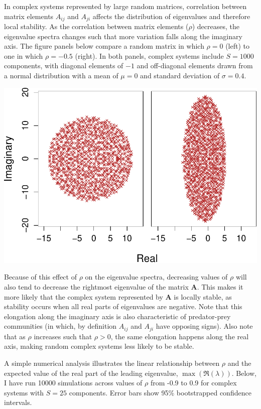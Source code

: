 \documentclass[]{article}
\begin{document}
In complex systems represented by large random matrices, correlation
between matrix elements \(A_{ij}\) and \(A_{ji}\) affects the
distribution of eigenvalues and therefore local stability. As the
correlation between matrix elements (\(\rho\)) decreases, the eigenvalue
spectra changes such that more variation falls along the imaginary axis.
The figure panels below compare a random matrix in which \(\rho = 0\)
(left) to one in which \(\rho = -0.5\) (right). In both panels, complex
systems include \(S = 1000\) components, with diagonal elements of
\(-1\) and off-diagonal elements drawn from a normal distribution with a
mean of \(\mu = 0\) and standard deviation of \(\sigma = 0.4\).

\includegraphics{revision_notes_files/figure-latex/unnamed-chunk-5-1.pdf}

Because of this effect of \(\rho\) on the eigenvalue spectra, decreasing
values of \(\rho\) will also tend to decrease the rightmost eigenvalue
of the matrix \(\textbf{A}\). This makes it more likely that the complex
system represented by \(\textbf{A}\) is locally stable, as stability
occurs when all real parts of eigenvalues are negative. Note that this
elongation along the imaginary axis is also characteristic of
predator-prey communities (in which, by definition \(A_{ij}\) and
\(A_{ji}\) have opposing signs). Also note that as \(\rho\) increases
such that \(\rho > 0\), the same elongation happens along the real axis,
making random complex systems less likely to be stable.

A simple numerical analysis illustrates the linear relationship between
\(\rho\) and the expected value of the real part of the leading
eigenvalue, \(\max(\Re(\lambda))\). Below, I have run 10000 simulations
across values of \(\rho\) from -0.9 to 0.9 for complex systems with
\(S = 25\) components. Error bars show 95\% bootstrapped confidence
intervals.
\end{document}
